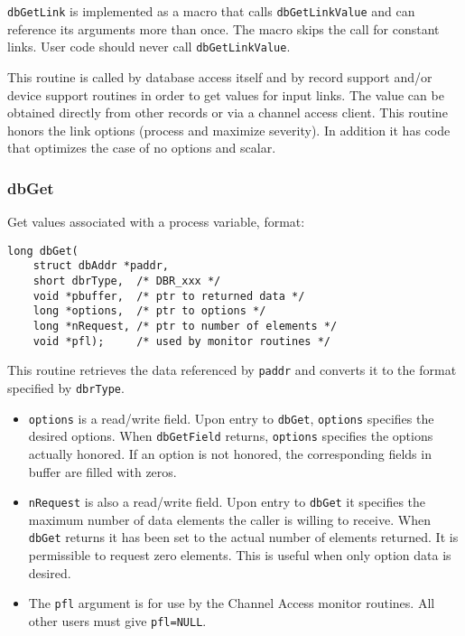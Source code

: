 \verb|dbGetLink| is implemented as a macro that calls \verb|dbGetLinkValue| and can reference its arguments more than once. 
The macro skips the call for constant links. User code should never call \verb|dbGetLinkValue|.

This routine is called by database access itself and by record support and/or device support routines in order to get values 
for input links. The value can be obtained directly from other records or via a channel access client. This routine honors 
the link options (process and maximize severity). In addition it has code that optimizes the case of no options and scalar.

\subsubsection{dbGet}

Get values associated with a process variable, format:

\begin{verbatim}
long dbGet(
    struct dbAddr *paddr,
    short dbrType,  /* DBR_xxx */
    void *pbuffer,  /* ptr to returned data */
    long *options,  /* ptr to options */
    long *nRequest, /* ptr to number of elements */
    void *pfl);     /* used by monitor routines */
\end{verbatim}

This routine retrieves the data referenced by \verb|paddr| and converts it to the format specified by \verb|dbrType|. 

\begin{itemize}
\item \verb|options| is a read/write field. Upon entry to \verb|dbGet|, \verb|options| specifies the desired options. When 
\verb|dbGetField| returns, \verb|options| specifies the options actually honored. If an option is not honored, the 
corresponding fields in buffer are filled with zeros.

\item \verb|nRequest| is also a read/write field. Upon entry to \verb|dbGet| it specifies the maximum number of data elements the 
caller is willing to receive. When \verb|dbGet| returns it has been set to the actual number of elements returned. It is 
permissible to request zero elements. This is useful when only option data is desired.

\item The \verb|pfl| argument is for use by the Channel Access monitor routines. All other users must give \verb|pfl=NULL|.

\end{itemize}


